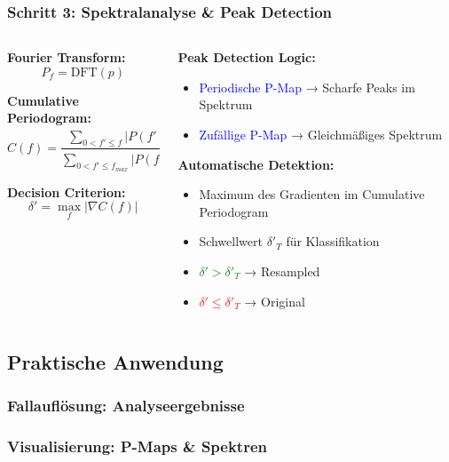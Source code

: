 \documentclass[11pt,t,usepdftitle=false,aspectratio=169]{beamer}
\begin{document}
\begin{frame}
	\frametitle{Schritt 3: Spektralanalyse \& Peak Detection}
	
	\begin{columns}[T]
		\begin{column}{0.45\textwidth}
			\textbf{Fourier Transform:}
			$$P_f = \text{DFT}(p)$$
			
			\vspace{0.5em}
			\textbf{Cumulative Periodogram:}
			$$C(f) = \frac{\sum_{0<f' \leq f} |P(f')|^2}{\sum_{0<f' \leq f_{max}} |P(f')|^2}$$
			
			\vspace{0.5em}
			\textbf{Decision Criterion:}
			$$\delta' = \max_f |\nabla C(f)|$$
		\end{column}
		\begin{column}{0.5\textwidth}
			\textbf{Peak Detection Logic:}
			\begin{itemize}
				\item \textcolor{blue}{Periodische P-Map} → Scharfe Peaks im Spektrum
				\item \textcolor{blue}{Zufällige P-Map} → Gleichmäßiges Spektrum
			\end{itemize}
			
			\vspace{0.5em}
			\textbf{Automatische Detektion:}
			\begin{itemize}
				\item Maximum des Gradienten im Cumulative Periodogram
				\item Schwellwert $\delta'_T$ für Klassifikation
				\item \textcolor{green}{$\delta' > \delta'_T$} → Resampled
				\item \textcolor{red}{$\delta' \leq \delta'_T$} → Original
			\end{itemize}
		\end{column}
	\end{columns}
\end{frame}

\subsection{Praktische Anwendung}

\begin{frame}
	\frametitle{Fallauflösung: Analyseergebnisse}
	
\end{frame}

\begin{frame}
	\frametitle{Visualisierung: P-Maps \& Spektren}

\end{frame}
\end{document}
